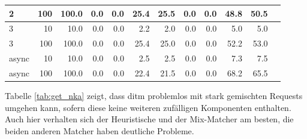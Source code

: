 \documentclass[12pt,a4paper]{report}
\begin{document}
\begin{table}[H]
\begin{tabular}{|l|r|r|r|r|r|r|r|r|r|r|r|}
		2                        & 100                            & 100.0                          & 0.0                           & 0.0                           & 25.4                            & 25.5 & 0.0 & 0.0 & 48.8 & 50.5 \\ \hline
		3                        & 10                             & 10.0                           & 0.0                           & 0.0                           & 2.2                             & 2.0  & 0.0 & 0.0 & 5.0  & 5.0  \\ \hline
		3                        & 100                            & 100.0                          & 0.0                           & 0.0                           & 25.4                            & 25.0 & 0.0 & 0.0 & 52.2 & 53.0 \\ \hline
		async                    & 10                             & 10.0                           & 0.0                           & 0.0                           & 2.5                             & 2.5  & 0.0 & 0.0 & 7.3  & 7.5  \\ \hline
		async                    & 100                            & 100.0                          & 0.0                           & 0.0                           & 22.4                            & 21.5 & 0.0 & 0.0 & 68.2 & 65.5 \\ \hline
	\end{tabular}
\end{table}

Tabelle \ref{tab:get_nka} zeigt, dass ditm problemlos mit stark gemischten Requests umgehen kann, sofern diese keine weiteren zufälligen
Komponenten enthalten. Auch hier verhalten sich der Heuristische und der Mix-Matcher am besten, die beiden anderen
Matcher haben deutliche Probleme.
\end{document}
